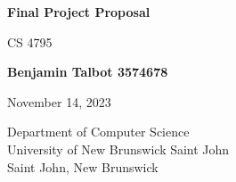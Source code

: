 \begin{titlepage}
    \begin{center}
        \vspace*{1cm}

        \LARGE
        \textbf{Final Project Proposal}

        \vspace{0.5cm}
        \Large
        CS 4795

        \vspace{2cm}

        \textbf{Benjamin Talbot 3574678}
        
        \vspace{0.5cm}
        November 14, 2023
        
        \vspace{9.5cm}

        \large
        Department of Computer Science\\
        University of New Brunswick Saint John\\
        Saint John, New Brunswick\\
        \date{\today}
    \end{center}
\end{titlepage}